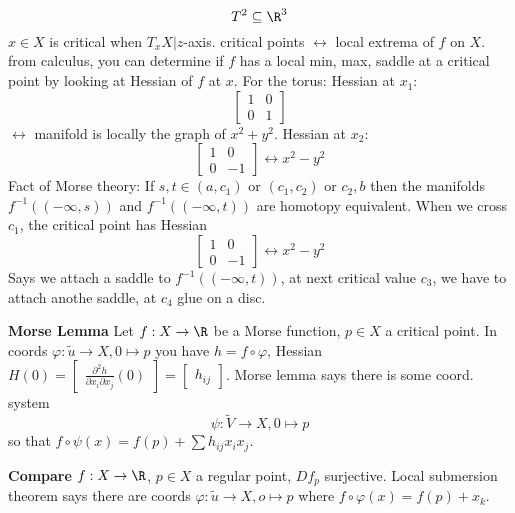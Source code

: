   $$T^2\subseteq \R^3$$
  $x \in X$ is critical when $T_xX \vert z$-axis.
  \newline  critical points $\leftrightarrow $ local extrema of $f$ on $X$.
  \newline from calculus, you can determine if $f$ has a local min, max, saddle at a critical point by looking at Hessian of $f$ at $x$.
  \newline For the torus:
  \newline Hessian at $x_1$:
    $$
    \begin{bmatrix}
      1 & 0 \\
      0 & 1
    \end{bmatrix}
    $$
    $\leftrightarrow $ manifold is locally the graph of $x^2+y^2$.
  \newline Hessian at $x_2$:
    $$
    \begin{bmatrix}
      1 & 0 \\
      0 & -1
    \end{bmatrix}
    \leftrightarrow x^2-y^2
    $$
  Fact of Morse theory: If $s,t \in (a,c_1)$ or $(c_1,c_2)$ or $c_2,b$ then the manifolds $f^{-1}((-\infty,s))$ and $f^{-1}((-\infty,t))$ are homotopy equivalent.
  \newline When we cross $c_1$, the critical point has Hessian
    $$  \begin{bmatrix}
        1 & 0 \\
        0 & -1
      \end{bmatrix}
      \leftrightarrow x^2-y^2$$
    Says we attach a saddle to $f ^{-1}((-\infty,t))$, at next critical value $c_3$, we have to attach anothe saddle, at $c_4$ glue on a disc.

\begin{lemma}
  \textbf{Morse Lemma}
    Let $f: X \to \R$ be a Morse function, $p\in X$ a critical point. In coords $\varphi : \tilde{u } \to X, 0 \mapsto p$ you have $h = f \circ \varphi $, Hessian $H(0)=
    \begin{bmatrix}
        \frac{\partial^2 h}{\partial x_i \partial x_j}(0)
    \end{bmatrix}=
    \begin{bmatrix}
      h_{ij}
    \end{bmatrix}
    $. Morse lemma says there is some coord. system
      $$\psi: \tilde{V} \to X, 0 \mapsto p$$
    so that $f \circ \psi (x)=f(p)+ \sum h_{ij} x_ix_j$.
\end{lemma}
\textbf{Compare}
$f: X \to \R$, $p\in X$ a regular point, $Df_p$ surjective. Local submersion theorem says there are coords $\varphi : \tilde{u} \to X, o\mapsto p$ where $f \circ \varphi (x)=f(p)+x_k$.

